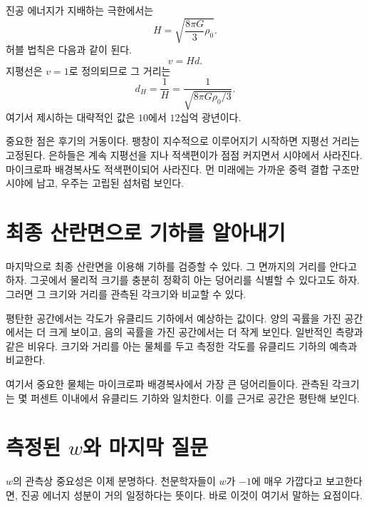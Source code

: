 진공 에너지가 지배하는 극한에서는
\begin{equation}
H=\sqrt{\frac{8\pi G}{3}\rho_0}.
\end{equation}
허블 법칙은 다음과 같이 된다.
\begin{equation}
v=Hd.
\end{equation}
지평선은 \(v=1\)로 정의되므로 그 거리는
\begin{equation}
d_H=\frac{1}{H}
=
\frac{1}{\sqrt{8\pi G\rho_0/3}}.
\end{equation}
여기서 제시하는 대략적인 값은 \(10\)에서 \(12\)십억 광년이다.

중요한 점은 후기의 거동이다. 팽창이 지수적으로 이루어지기 시작하면 지평선 거리는 고정된다. 은하들은 계속 지평선을 지나 적색편이가 점점 커지면서 시야에서 사라진다. 마이크로파 배경복사도 적색편이되어 사라진다. 먼 미래에는 가까운 중력 결합 구조만 시야에 남고, 우주는 고립된 섬처럼 보인다.

\section{최종 산란면으로 기하를 알아내기}

마지막으로 최종 산란면을 이용해 기하를 검증할 수 있다. 그 면까지의 거리를 안다고 하자. 그곳에서 물리적 크기를 충분히 정확히 아는 덩어리를 식별할 수 있다고도 하자. 그러면 그 크기와 거리를 관측된 각크기와 비교할 수 있다.

평탄한 공간에서는 각도가 유클리드 기하에서 예상하는 값이다. 양의 곡률을 가진 공간에서는 더 크게 보이고, 음의 곡률을 가진 공간에서는 더 작게 보인다. 일반적인 측량과 같은 비유다. 크기와 거리를 아는 물체를 두고 측정한 각도를 유클리드 기하의 예측과 비교한다.

\begin{classroomqa}
\end{classroomqa}

여기서 중요한 물체는 마이크로파 배경복사에서 가장 큰 덩어리들이다. 관측된 각크기는 몇 퍼센트 이내에서 유클리드 기하와 일치한다. 이를 근거로 공간은 평탄해 보인다.

\section{측정된 \(w\)와 마지막 질문}

\(w\)의 관측상 중요성은 이제 분명하다. 천문학자들이 \(w\)가 \(-1\)에 매우 가깝다고 보고한다면, 진공 에너지 성분이 거의 일정하다는 뜻이다. 바로 이것이 여기서 말하는 요점이다.

